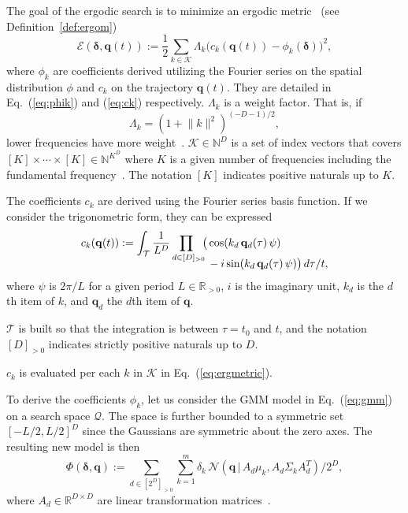 \documentclass[letterpaper,10pt,conference,twoside]{IEEEtran}
\theoremstyle{definition}
\begin{document}
The goal of the ergodic search is to minimize an ergodic metric~\cite{mathew2011metrics} (see Definition~\ref{def:ergom})
\begin{equation}\label{eq:ergmetric}
  \mathcal{E}(\boldsymbol{\delta},\mathbf{q}(t)):=\frac{1}{2}\sum_{k\in\mathcal{K}}\Lambda_k \big( c_k(\mathbf{q}(t))-\phi_k(\boldsymbol{\delta}) \big)^2,
\end{equation}
where $\phi_k$ are coefficients derived utilizing the Fourier series on the spatial distribution $\phi$ and $c_k$ on the trajectory $\mathbf{q}(t)$. They are detailed in Eq.~(\ref{eq:phik}) and (\ref{eq:ck}) respectively.
$\Lambda_k$ is a weight factor. That is, if 
\begin{equation}
  \Lambda_k=(1+\lVert k\rVert^2)^{(-D-1)/2},
\end{equation}
lower frequencies have more weight~\cite{miller2016ergodic}.
$\mathcal{K}\in\mathbb{N}^D$ is a set of index vectors that covers $[K]\times\cdots\times[K]\in\mathbb{N}^{K^D}$ 
where $K$ is a given number of frequencies including the fundamental frequency~\cite{calinon2020mixture}. The notation $[K]$ indicates positive naturals up to $K$.

The coefficients $c_k$ are derived using the Fourier series basis function. If we consider the trigonometric form, they can be expressed
\begin{equation}\label{eq:ck}
  \begin{split}
    c_k(\mathbf{q}(t)):=\int_{\mathcal{T}}\frac{1}{L^D}\prod_{d\in[D]_{>0}\hspace*{-1ex}}\big(& \cos(k_d\,\mathbf{q}_d(\tau)\,\psi)\\[-2ex]
    &\vspace*{-4ex}-i\sin(k_d\,\mathbf{q}_d(\tau)\,\psi) \big)\,d\tau/t,
  \end{split}
\end{equation}
where $\psi$ is $2\pi/L$ for a given period $L\in\mathbb{R}_{>0}$, $i$ is the imaginary unit, $k_d$ is the $d$th item of $k$, and $\mathbf{q}_d$ the $d$th item of $\mathbf{q}$.

$\mathcal{T}$ is built so that the integration is between $\tau=t_0$ and $t$, and the notation $[D]_{>0}$ indicates strictly positive naturals up to $D$.

$c_k$ is evaluated per each $k$ in $\mathcal{K}$ in Eq.~(\ref{eq:ergmetric}).

To derive the coefficients $\phi_k$, let us consider the GMM model in Eq.~(\ref{eq:gmm}) on a search space $\mathcal{Q}$. The space is further bounded to a symmetric set $[-L/2,L/2]^D$ since the Gaussians are symmetric about the zero axes. The resulting new model is then
\begin{equation}
  \Phi(\boldsymbol{\delta},\mathbf{q}):=\sum_{d\in[2^D]_{>0}}\sum_{k=1}^{m}\delta_k\,\mathcal{N}(\mathbf{q}\,|\,A_d\mu_k,A_d\Sigma_k A_d^T)/2^D,
\end{equation}
where $A_d\in\mathbb{R}^{D\times D}$ are linear transformation matrices~\cite{calinon2020mixture}. 
\end{document}
